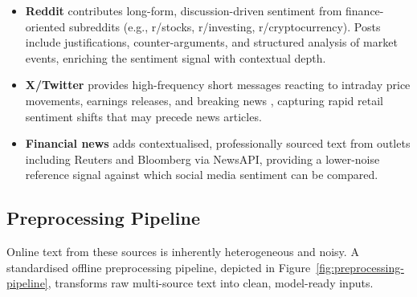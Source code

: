\begin{itemize}
    \item \textbf{Reddit} contributes long-form, discussion-driven sentiment from finance-oriented subreddits (e.g., r/stocks, r/investing, r/cryptocurrency).  Posts include justifications, counter-arguments, and structured analysis of market events, enriching the sentiment signal with contextual depth.
    \item \textbf{X/Twitter} provides high-frequency short messages reacting to intraday price movements, earnings releases, and breaking news \citep{bollen2011twitter}, capturing rapid retail sentiment shifts that may precede news articles.
    \item \textbf{Financial news} adds contextualised, professionally sourced text from outlets including Reuters and Bloomberg via NewsAPI, providing a lower-noise reference signal against which social media sentiment can be compared.
\end{itemize}

\subsection{Preprocessing Pipeline}

Online text from these sources is inherently heterogeneous and noisy.  A standardised offline preprocessing pipeline, depicted in Figure~\ref{fig:preprocessing-pipeline}, transforms raw multi-source text into clean, model-ready inputs.

